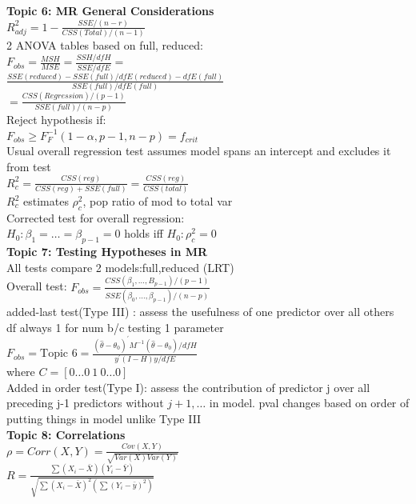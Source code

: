 \documentclass[10pt,landscape]{article}
\newcommand{\B}{\beta}
\newcommand{\hth}{\hat{\theta}}
\newcommand{\ta}{\theta}
\newcommand{\p}{\prime}
\begin{document}
\begin{multicols*}{4}
\textbf{Topic 6: MR General Considerations}\\
$R^2_{adj}=1-\frac{SSE/(n-r)}{CSS(Total)/(n-1)}$\\
2 ANOVA tables based on full, reduced:\\
$F_{obs}=\frac{MSH}{MSE}=\frac{SSH/dfH}{SSE/dfE}=$\\
$\frac{SSE(reduced)-SSE(full)/dfE(reduced)-dfE(full)}{SSE(full)/dfE(full)}$\\
$=\frac{CSS(Regression)/(p-1)}{SSE(full)/(n-p)}$\\
Reject hypothesis if:\\
$F_{obs}\geq F^{-1}_{F}(1-\alpha,p-1,n-p)=f_{crit}$\\
Usual overall regression test assumes model spans an intercept and excludes it from test\\
$R_c^2=\frac{CSS(reg)}{CSS(reg)+SSE(full)}=\frac{CSS(reg)}{CSS(total)}$\\
$R_c^2$ estimates $\rho_c^2$, pop ratio of mod to total var\\
Corrected test for overall regression:\\
$H_0:\B_1=\dots=\B_{p-1}=0$ holds iff $H_0:\rho_c^2=0$\\


\textbf{Topic 7: Testing Hypotheses in MR}\\
All tests compare 2 models:full,reduced (LRT)\\
Overall test: $F_{obs}=\frac{CSS(\B_1,\dots,B_{p-1})/(p-1)}{SSE(\B_0,\dots,\B_{p-1})/(n-p)}$\\
added-last test(Type III) : assess the usefulness of one predictor over all others\\
df always 1 for num b/c testing 1 parameter\\
$F_{obs}=\text{Topic 6}=\frac{(\hth-\ta_0)^{\p}M^{-1}(\hth-\ta_0)/dfH}{y^{\p}(I-H)y/dfE}$\\
where $C=[0\dots 0\ 1\ 0\dots 0]$\\
Added in order test(Type I): assess the contribution of predictor j over all preceding j-1 predictors without $j+1,\dots$ in model. pval changes based on order of putting things in model unlike Type III\\


\textbf{Topic 8: Correlations}\\
$\rho=Corr(X,Y)=\frac{Cov(X,Y)}{\sqrt{Var(X)Var(Y)}}$\\
$R=\frac{\sum(X_i-\bar{X})(Y_i-\bar{Y})}{\sqrt{\sum(X_i-\bar{X})^2(\sum(Y_i-\bar{y})^2)}}$\\



\end{multicols*}
\end{document}
